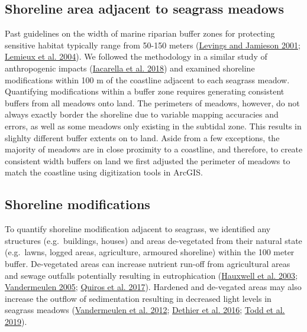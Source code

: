 \documentclass[12pt]{article}\usepackage[]{graphicx}\usepackage[]{color}
\begin{document}
\hypertarget{shoreline-area-adjacent-to-seagrass-meadows}{%
\subsection{Shoreline area adjacent to seagrass meadows}\label{shoreline-area-adjacent-to-seagrass-meadows}}

Past guidelines on the width of marine riparian buffer zones for protecting sensitive habitat typically range from 50-150 meters (\protect\hyperlink{ref-Levings2001}{Levings and Jamieson 2001}; \protect\hyperlink{ref-Lemieux2004}{Lemieux et al. 2004}). We followed the methodology in a similar study of anthropogenic impacts (\protect\hyperlink{ref-Iacarella2018}{Iacarella et al. 2018}) and examined shoreline modifications within 100 m of the coastline adjacent to each seagrass meadow. Quantifying modifications within a buffer zone requires generating consistent buffers from all meadows onto land. The perimeters of meadows, however, do not always exactly border the shoreline due to variable mapping accuracies and errors, as well as some meadows only existing in the subtidal zone. This results in slighlty different buffer extents on to land. Aside from a few exceptions, the majority of meadows are in close proximity to a coastline, and therefore, to create consistent width buffers on land we first adjusted the perimeter of meadows to match the coastline using digitization tools in ArcGIS.

\hypertarget{shoreline-modifications}{%
\subsection{Shoreline modifications}\label{shoreline-modifications}}

To quantify shoreline modification adjacent to seagrass, we identified any structures (e.g.~buildings, houses) and areas de-vegetated from their natural state (e.g.~lawns, logged areas, agriculture, armoured shoreline) within the 100 meter buffer. De-vegetated areas can increase nutrient run-off from agricultural areas and sewage outfalls potentially resulting in eutrophication (\protect\hyperlink{ref-hauxwell2003}{Hauxwell et al. 2003}; \protect\hyperlink{ref-vandermeulen2005}{Vandermeulen 2005}; \protect\hyperlink{ref-Quiros2017}{Quiros et al. 2017}). Hardened and de-vegated areas may also increase the outflow of sedimentation resulting in decreased light levels in seagrass meadows (\protect\hyperlink{ref-Vandermeulen2012}{Vandermeulen et al. 2012}; \protect\hyperlink{ref-Dethier2016}{Dethier et al. 2016}; \protect\hyperlink{ref-Todd2019}{Todd et al. 2019}).
\end{document}
